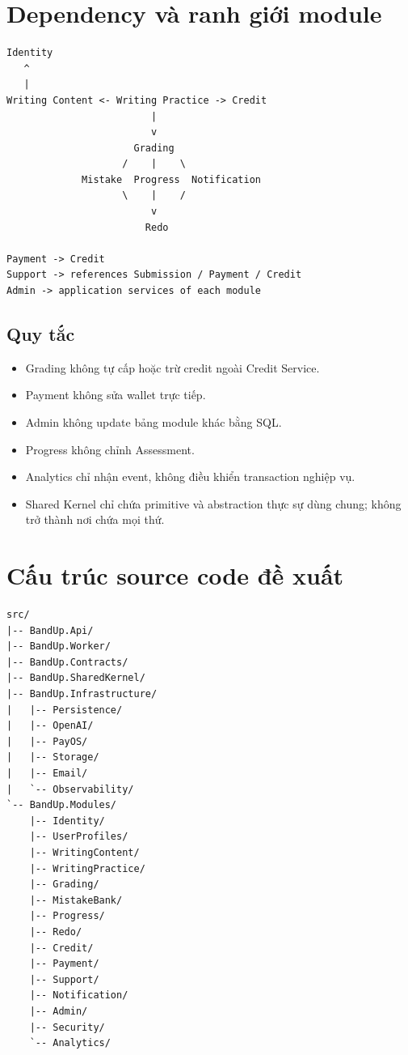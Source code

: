 \documentclass[11pt,a4paper]{article}
\begin{document}
\section{Dependency và ranh giới module}

\begin{architecturebox}
\begin{lstlisting}
Identity
   ^
   |
Writing Content <- Writing Practice -> Credit
                         |
                         v
                      Grading
                    /    |    \
             Mistake  Progress  Notification
                    \    |    /
                         v
                        Redo

Payment -> Credit
Support -> references Submission / Payment / Credit
Admin -> application services of each module
\end{lstlisting}
\end{architecturebox}

\subsection{Quy tắc}
\begin{itemize}
  \item Grading không tự cấp hoặc trừ credit ngoài Credit Service.
  \item Payment không sửa wallet trực tiếp.
  \item Admin không update bảng module khác bằng SQL.
  \item Progress không chỉnh Assessment.
  \item Analytics chỉ nhận event, không điều khiển transaction nghiệp vụ.
  \item Shared Kernel chỉ chứa primitive và abstraction thực sự dùng chung; không trở thành nơi chứa mọi thứ.
\end{itemize}

\section{Cấu trúc source code đề xuất}

\begin{lstlisting}
src/
|-- BandUp.Api/
|-- BandUp.Worker/
|-- BandUp.Contracts/
|-- BandUp.SharedKernel/
|-- BandUp.Infrastructure/
|   |-- Persistence/
|   |-- OpenAI/
|   |-- PayOS/
|   |-- Storage/
|   |-- Email/
|   `-- Observability/
`-- BandUp.Modules/
    |-- Identity/
    |-- UserProfiles/
    |-- WritingContent/
    |-- WritingPractice/
    |-- Grading/
    |-- MistakeBank/
    |-- Progress/
    |-- Redo/
    |-- Credit/
    |-- Payment/
    |-- Support/
    |-- Notification/
    |-- Admin/
    |-- Security/
    `-- Analytics/
\end{lstlisting}
\end{document}
